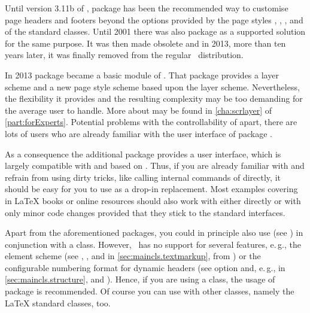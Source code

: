 Until version 3.11b of \KOMAScript, package  has been the
recommended way to customise page headers and footers beyond the options
provided by the page styles , ,
, and  of the standard \KOMAScript{}
classes.  Until 2001 there was also package  as a supported
solution for the same purpose. It was then made obsolete and in 2013, more
than ten years later, it was finally removed from the regular
\KOMAScript~distribution.

In 2013 package  became a basic
module of \KOMAScript. That package provides a layer scheme and a new page
style scheme based upon the layer scheme. Nevertheless, the flexibility it
provides and the resulting complexity may be too demanding for the average
user to handle.  More about  may be found in
\autoref{cha:scrlayer} of \autoref{part:forExperts}. Potential problems with
the controllability of  apart, there are lots of users who
are already familiar with the user interface of package .

As a consequence the additional package  provides a
user interface, which is largely compatible with  and based
on . Thus, if you are already familiar with 
and refrain from using dirty tricks, like calling internal commands of 
 directly, it should be easy for you to use 
 as a drop-in replacement. Most examples covering 
 in \LaTeX{} books or online resources should also work 
with  either directly or with only minor
code changes provided that they stick to the standard interfaces. 

Apart from the aforementioned \KOMAScript{} packages, you could in principle
also use  (see
\cite{package:fancyhdr}) in conjunction with a \KOMAScript{} class. However,
\ has no support for several \KOMAScript{} features, e.\,g.,
the element scheme (see ,
, and
 in \autoref{sec:maincls.textmarkup}, from
) or the configurable numbering format
for dynamic headers (see option  and, e.\,g.,
 in \autoref{sec:maincls.structure},
 and
). Hence, if you are using a
\KOMAScript{} class, the usage of package  is
recommended. Of course you can use  with other
classes, namely the \LaTeX{} standard classes, too.

